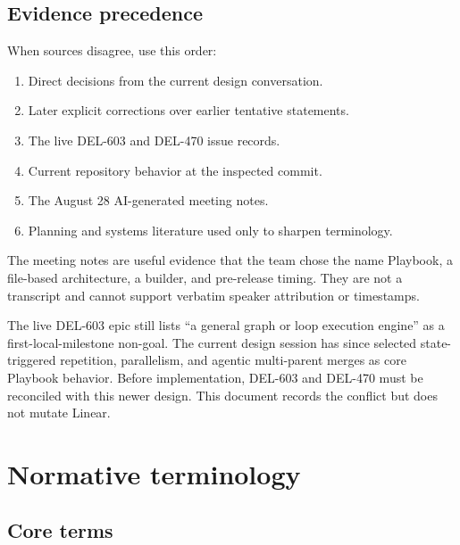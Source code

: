 \documentclass[11pt]{article}
\begin{document}
\subsection{Evidence precedence}

When sources disagree, use this order:

\begin{enumerate}
  \item Direct decisions from the current design conversation.
  \item Later explicit corrections over earlier tentative statements.
  \item The live DEL-603 and DEL-470 issue records.
  \item Current repository behavior at the inspected commit.
  \item The August 28 AI-generated meeting notes.
  \item Planning and systems literature used only to sharpen terminology.
\end{enumerate}

The meeting notes are useful evidence that the team chose the name Playbook, a file-based architecture, a builder, and pre-release timing. They are not a transcript and cannot support verbatim speaker attribution or timestamps.

\begin{warningbox}
The live DEL-603 epic still lists ``a general graph or loop execution engine'' as a first-local-milestone non-goal. The current design session has since selected state-triggered repetition, parallelism, and agentic multi-parent merges as core Playbook behavior. Before implementation, DEL-603 and DEL-470 must be reconciled with this newer design. This document records the conflict but does not mutate Linear.
\end{warningbox}

\Needspace{0.45\textheight}
\section{Normative terminology}

\subsection{Core terms}
\end{document}
